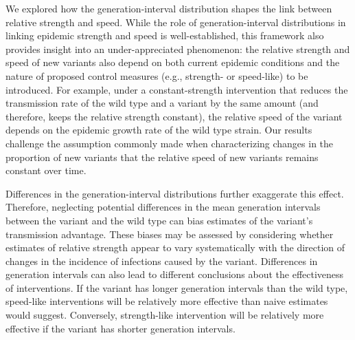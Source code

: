 \documentclass[12pt]{article}
\begin{document}
We explored how the generation-interval distribution shapes the link between relative strength and speed.
While the role of generation-interval distributions in linking epidemic strength and speed is well-established, this framework also provides insight into an under-appreciated phenomenon: the relative strength and speed of new variants also depend on both current epidemic conditions and the nature of proposed control measures (e.g., strength- or speed-like) to be introduced.
For example, under a constant-strength intervention that reduces the transmission rate of the wild type and a variant by the same amount (and therefore, keeps the relative strength constant), the relative speed of the variant depends on the epidemic growth rate of the wild type strain.
Our results challenge the assumption commonly made when characterizing changes in the proportion of new variants that the relative speed of new variants remains constant over time.

Differences in the generation-interval distributions further exaggerate this effect.
Therefore, neglecting potential differences in the mean generation intervals between the variant and the wild type can bias estimates of the variant's transmission advantage.
These biases may be assessed by considering whether estimates of relative strength appear to vary systematically with the direction of changes in the incidence of infections caused by the variant.
Differences in generation intervals can also lead to different conclusions about the effectiveness of interventions.
If the variant has longer generation intervals than the wild type, speed-like interventions will be relatively more effective than naive estimates would suggest. 
Conversely, strength-like intervention will be relatively more effective if the variant has shorter generation intervals.
\end{document}
